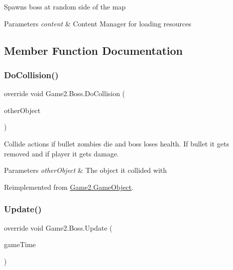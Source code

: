 Spawns boss at random side of the map 


\begin{DoxyParams}{Parameters}
{\em content} & Content Manager for loading resources\\
\hline
\end{DoxyParams}


\subsection{Member Function Documentation}
\mbox{\label{class_game2_1_1_boss_a8331b445604b8737664d58bf02f82ce1}} 
\subsubsection{\texorpdfstring{Do\+Collision()}{DoCollision()}}
{\footnotesize\ttfamily override void Game2.\+Boss.\+Do\+Collision (\begin{DoxyParamCaption}\item[{\mbox{\hyperlink{class_game2_1_1_game_object}{Game\+Object}}}]{other\+Object }\end{DoxyParamCaption})\hspace{0.3cm}{\ttfamily [virtual]}}



Collide actions if bullet zombies die and boss loses health. If bullet it gets removed and if player it gets damage. 


\begin{DoxyParams}{Parameters}
{\em other\+Object} & The object it collided with\\
\hline
\end{DoxyParams}


Reimplemented from \mbox{\hyperlink{class_game2_1_1_game_object_aa811d23c405b9aa28ab922901d0a3002}{Game2.\+Game\+Object}}.

\mbox{\label{class_game2_1_1_boss_ab120124b7af0edebcb1664e2feaa6590}} 
\subsubsection{\texorpdfstring{Update()}{Update()}}
{\footnotesize\ttfamily override void Game2.\+Boss.\+Update (\begin{DoxyParamCaption}\item[{Game\+Time}]{game\+Time }\end{DoxyParamCaption})\hspace{0.3cm}{\ttfamily [virtual]}}



